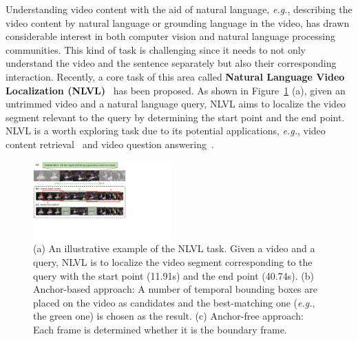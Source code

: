 \documentclass[letterpaper]{article} %
\newcommand{\eg}{\emph{e.g.}}
\begin{document}
Understanding video content with the aid of natural language, \eg, describing the video content by natural language or 
grounding language in the video, has drawn considerable interest in both computer vision and natural language processing communities. 
This kind of task is challenging since it needs to not only understand the video and the sentence separately but also their corresponding interaction.
Recently, a core task of this area called \textbf{Natural Language Video Localization (NLVL)}~\cite{DBLP:conf/iccv/GaoSYN17,DBLP:conf/iccv/HendricksWSSDR17} has been proposed. 
As shown in Figure~\ref{figure1} (a), given an untrimmed video and a natural language query, NLVL aims to localize the video segment relevant to the query by determining the start point and the end point. 
NLVL is a worth exploring task due to its potential applications, \eg, video content retrieval~\cite{DBLP:conf/eccv/ShaoXZHQL18} and video question answering~\cite{DBLP:conf/emnlp/LeiYBB18,xiao2020hierarchical,ye2017video}.

\begin{figure}[t]
    \centering
    \includegraphics[width=0.475\textwidth]{figure1_1_cut.pdf} %
    \caption{(a) An illustrative example of the NLVL task.
    Given a video and a query, NLVL is to localize the video segment corresponding to the query with the 
    start point (11.91s) and the end point (40.74s).
    (b) Anchor-based approach: A number of temporal bounding boxes are placed on the video as candidates 
    and the best-matching one (\eg, the green one) is chosen as the result. 
    (c) Anchor-free approach: Each frame is determined whether it is the boundary frame.
    }
    \label{figure1}
\end{figure}
\end{document}

